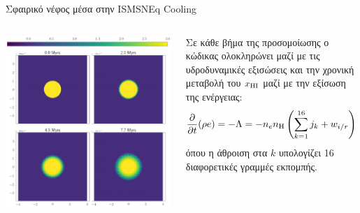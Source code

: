 \documentclass{beamer}
\begin{document}
\begin{frame}{Σφαιρικό νέφος μέσα στην ISM}{SNEq Cooling}
	\begin{columns}
			\begin{center}
				\includegraphics[width=1\linewidth]{../Document/DataImages/SNCoolingRHOquad}
			\end{center}
			Σε κάθε βήμα της προσομοίωσης ο κώδικας ολοκληρώνει μαζί με τις υδροδυναμικές εξισώσεις και την χρονική μεταβολή του $x_{\ce{HI}}$ 
		μαζί με την εξίσωση της ενέργειας:
		\begin{equation}
		\pdv{t}(\rho e)=-\Lambda=-n_e n_{\ce{H}} \left( \sum\limits_{k=1}^{16}j_k +w_{i/r} \right) 
		\end{equation}
		όπου η άθροιση στα $k$ υπολογίζει 16 διαφορετικές γραμμές εκπομπής.
	\end{columns}
\end{frame}
\end{document}
